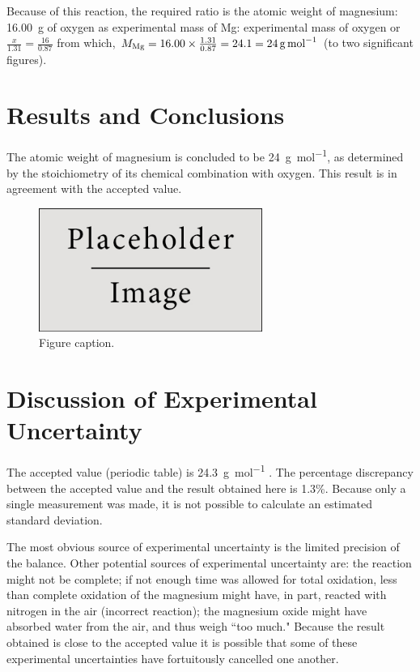 \documentclass{article}
\begin{document}
Because of this reaction, the required ratio is the atomic weight of magnesium: \SI{16.00}{\gram} of oxygen as experimental mass of Mg: experimental mass of oxygen or $\frac{x}{1.31}=\frac{16}{0.87}$ from which, $M_{\ce{Mg}} = 16.00 \times \frac{1.31}{0.87} = 24.1 = \SI{24}{\gram\per\mole}$ (to two significant figures).

\section{Results and Conclusions}

The atomic weight of magnesium is concluded to be \SI{24}{\gram\per\mol}, as determined by the stoichiometry of its chemical combination with oxygen. This result is in agreement with the accepted value.

\begin{figure}[h]
\begin{center}
\includegraphics[width=0.65\textwidth]{placeholder} %
\caption{Figure caption.}
\end{center}
\end{figure}

\section{Discussion of Experimental Uncertainty}

The accepted value (periodic table) is \SI{24.3}{\gram\per\mole} \cite{Smith:2012qr}. The percentage discrepancy between the accepted value and the result obtained here is 1.3\%. Because only a single measurement was made, it is not possible to calculate an estimated standard deviation.

The most obvious source of experimental uncertainty is the limited precision of the balance. Other potential sources of experimental uncertainty are: the reaction might not be complete; if not enough time was allowed for total oxidation, less than complete oxidation of the magnesium might have, in part, reacted with nitrogen in the air (incorrect reaction); the magnesium oxide might have absorbed water from the air, and thus weigh ``too much." Because the result obtained is close to the accepted value it is possible that some of these experimental uncertainties have fortuitously cancelled one another.
\end{document}
